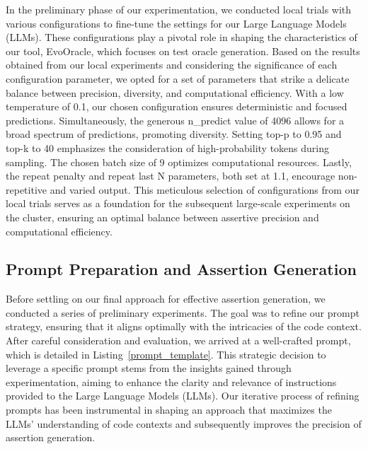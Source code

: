In the preliminary phase of our experimentation, we conducted local trials with various configurations to fine-tune the settings for our Large Language Models (LLMs). These configurations play a pivotal role in shaping the characteristics of our tool, EvoOracle, which focuses on test oracle generation. Based on the results obtained from our local experiments and considering the significance of each configuration parameter, we opted for a set of parameters that strike a delicate balance between precision, diversity, and computational efficiency. With a low temperature of 0.1, our chosen configuration ensures deterministic and focused predictions. Simultaneously, the generous n\_predict value of 4096 allows for a broad spectrum of predictions, promoting diversity. Setting top-p to 0.95 and top-k to 40 emphasizes the consideration of high-probability tokens during sampling. The chosen batch size of 9 optimizes computational resources. Lastly, the repeat penalty and repeat last N parameters, both set at 1.1, encourage non-repetitive and varied output. This meticulous selection of configurations from our local trials serves as a foundation for the subsequent large-scale experiments on the cluster, ensuring an optimal balance between assertive precision and computational efficiency.

\vspace{0.1 cm}
\subsection{Prompt Preparation and Assertion Generation}
\label{sec:prompt_preparation}
\vspace{0.1 cm}

Before settling on our final approach for effective assertion generation, we conducted a series of preliminary experiments. The goal was to refine our prompt strategy, ensuring that it aligns optimally with the intricacies of the code context. After careful consideration and evaluation, we arrived at a well-crafted prompt, which is detailed in Listing~\ref{prompt_template}. This strategic decision to leverage a specific prompt stems from the insights gained through experimentation, aiming to enhance the clarity and relevance of instructions provided to the Large Language Models (LLMs). Our iterative process of refining prompts has been instrumental in shaping an approach that maximizes the LLMs' understanding of code contexts and subsequently improves the precision of assertion generation.

